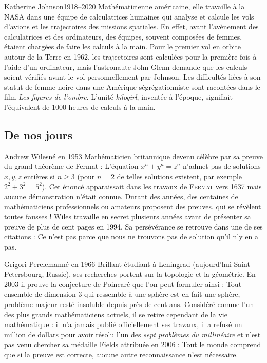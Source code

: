 \documentclass[10pt,class=article,crop=false]{standalone}
\begin{document}
\begin{multicols}{2}
\begin{biographie}{Katherine Johnson}{1918--2020}
Mathématicienne américaine, elle travaille à la NASA dans une équipe de \og{}calculatrices humaines\fg{} qui analyse et calcule les vols d'avions et les trajectoires des missions spatiales. En effet, avant l'avènement des calculatrices et des ordinateurs, des  équipes, souvent composées de femmes, étaient chargées de faire les calculs à la main. 
Pour le premier vol en orbite autour de la Terre en 1962, les trajectoires sont calculées pour la première fois à l'aide d'un ordinateur, mais l'astronaute John Glenn demande que les calculs soient vérifiés avant le vol personnellement par Johnson.
Les difficultés liées à son statut de femme noire dans une Amérique ségrégationniste sont racontées dans le film \emph{Les figures de l'ombre}. L'unité \emph{kilogirl}, inventée à l'époque, signifiait l'équivalent de 1000 heures de calculs à la main.
\end{biographie}


\subsection{De nos jours}

\begin{biographie}{Andrew Wiles}{né en 1953}
Mathématicien britannique devenu célèbre par sa preuve du grand théorème de Fermat : \og{}L'équation $x^n+y^n = z^n$ n'admet pas de solutions $x,y,z$ entières si $n\ge3$\fg{} (pour $n=2$ de telles solutions existent, par exemple $2^2+3^2=5^2$). Cet énoncé apparaissait dans les travaux de \textsc{Fermat} vers 1637 mais aucune démonstration n'était connue. 
Durant des années, des centaines de mathématiciens professionnels ou amateurs proposent des preuves, qui se révèlent toutes fausses !
Wiles travaille en secret plusieurs années avant de présenter sa preuve de plus de cent pages en 1994. Sa persévérance se retrouve dans une de ses citations :
\og{}Ce n'est pas parce que nous ne trouvons pas de solution qu'il n'y en a pas.\fg{}
\end{biographie}


\begin{biographie}{Grigori Pereleman}{né en 1966}
Brillant étudiant à Leningrad (aujourd'hui Saint Petersbourg, Russie), ses recherches portent sur la topologie et la géométrie.
En 2003 il prouve la conjecture de Poincaré que l'on peut formuler ainsi : \og{}Tout ensemble de dimension 3 qui ressemble à une sphère est en fait une sphère\fg{}, problème majeur resté insoluble depuis près de cent ans.
Considéré comme l'un des plus grands mathématiciens actuels, il se retire cependant de la vie mathématique : il n'a jamais publié officiellement ses travaux, il a refusé un million de dollars pour avoir résolu l'un des \emph{sept problèmes du millinéaire} et n'est pas venu chercher sa médaille Fields attribuée en 2006 : \og{}Tout le monde comprend que si la preuve est correcte, aucune autre reconnaissance n'est nécessaire.\fg{}
\end{biographie}



\end{multicols}
\end{document}
